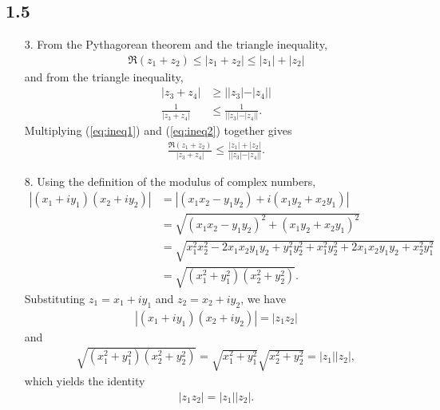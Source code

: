 \documentclass[a4paper,12pt]{article}
\begin{document}
\subsection*{1.5}
\begin{enumerate}
    \item[3.]
        From the Pythagorean theorem and the triangle inequality,
        \begin{align}
            \Re(z_1 + z_2) \leq |z_1 + z_2| \leq |z_1| + |z_2| \label{eq:ineq1}
        \end{align}
        and from the triangle inequality,
        \begin{align}
            |z_3 + z_4| &\geq ||z_3| - |z_4|| \\
            \frac{1}{|z_3 + z_4|} &\leq \frac{1}{||z_3| - |z_4||}. \label{eq:ineq2}
        \end{align}
        Multiplying (\ref{eq:ineq1}) and (\ref{eq:ineq2}) together gives
        \begin{align*}
            \frac{\Re(z_1 + z_2)}{|z_3 + z_4|} \leq \frac{|z_1| + |z_2|}{||z_3| - |z_4||}.
        \end{align*}

    \item[8.]
        Using the definition of the modulus of complex numbers,
        \begin{align*}
            |(x_1 + iy_1)(x_2 + iy_2)| &= |(x_1 x_2 - y_1 y_2) + i(x_1 y_2 + x_2 y_1)| \\
            &= \sqrt{(x_1 x_2 - y_1 y_2)^2 + (x_1 y_2 + x_2 y_1)^2} \\
            &= \sqrt{x_1^2 x_2^2 - 2 x_1 x_2 y_1 y_2 + y_1^2 y_2^2 + x_1^2 y_2^2 + 2 x_1 x_2 y_1 y_2 + x_2^2 y_1^2} \\
            &= \sqrt{(x_1^2 + y_1^2)(x_2^2 + y_2^2)}.
        \end{align*}
        Substituting $z_1 = x_1 + iy_1$ and $z_2 = x_2 + iy_2$, we have
        \begin{align*}
            |(x_1 + iy_1)(x_2 + iy_2)| = |z_1 z_2|
        \end{align*}
        and
        \begin{align*}
            \sqrt{(x_1^2 + y_1^2)(x_2^2 + y_2^2)} = \sqrt{x_1^2 + y_1^2} \sqrt{x_2^2 + y_2^2} = |z_1| |z_2|,
        \end{align*}
        which yields the identity
        \begin{align*}
            |z_1 z_2| = |z_1| |z_2|.
        \end{align*}
\end{enumerate}
\end{document}

